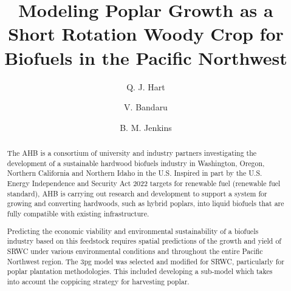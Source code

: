 \documentclass[preprint,12pt]{elsarticle}
\begin{document}
\begin{frontmatter}



\title{Modeling Poplar Growth as a Short Rotation Woody Crop for Biofuels in the Pacific Northwest}


\author[lawr]{Q. J. Hart}
\author[en]{V. Bandaru}
\author[bioag]{B. M. Jenkins}

\address{Department of Land, Air, and Water, University of California, Davis, USA}
\address{Energy Institute, University of California, Davis, USA}
\address{Department of Biological and Agricultural Engineering, University of California, Davis, USA}

\begin{abstract}
  The \acf{AHB} is a consortium of university and industry partners
  investigating the development of a sustainable hardwood biofuels
  industry in Washington, Oregon, Northern California and Northern
  Idaho in the U.S.  Inspired in part by the U.S. Energy Independence
  and Security Act 2022 targets for renewable fuel (renewable fuel
  standard), \ac{AHB} is carrying out research and development to
  support a system for growing and converting hardwoods, such as
  hybrid poplars, into liquid biofuels that are fully compatible with
  existing infrastructure.

  Predicting the economic viability and environmental sustainability
  of a biofuels industry based on this feedstock requires spatial
  predictions of the growth and yield of \acf{SRWC} under various
  environmental conditions and throughout the entire Pacific Northwest
  region.  The \acf{3pg} model was selected and modified for \ac{SRWC},
  particularly for poplar plantation methodologies.  This included
  developing a sub-model which takes into account the coppicing
  strategy for harvesting poplar.


\end{abstract}
\end{frontmatter}
\end{document}
